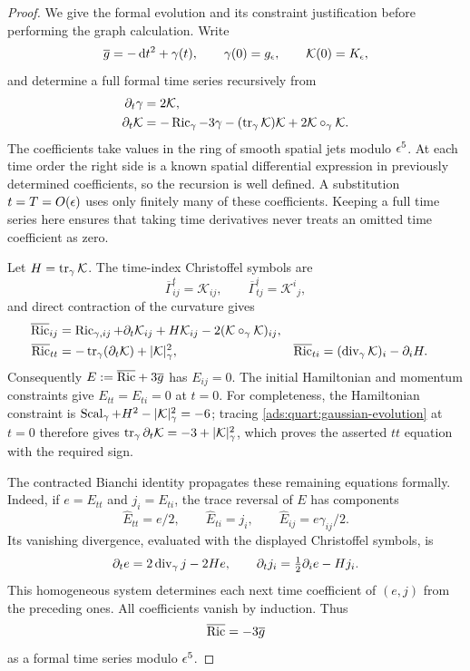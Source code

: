 \begin{proof}
We give the formal evolution and its constraint justification before
performing the graph calculation.  Write
\[
 \overline g=-\,\mathrm d t^2+\gamma(t),\qquad
 \gamma(0)=g_\epsilon,\qquad \mathcal K(0)=K_\epsilon,
\]
and determine a full formal time series recursively from
\begin{align}
 \partial_t\gamma&=2\mathcal K,\nonumber\\
 \partial_t\mathcal K
   &=-\operatorname{Ric}_\gamma-3\gamma
     -(\operatorname{tr}_\gamma\mathcal K)\mathcal K
     +2\mathcal K\circ_\gamma\mathcal K.
 \label{ads:quart:gaussian-evolution}
\end{align}
The coefficients take values in the ring of smooth spatial jets modulo
\(\epsilon^5\).  At each time order the right side is a known spatial
differential expression in previously determined coefficients, so the
recursion is well defined.  A substitution \(t=T=O(\epsilon)\) uses only
finitely many of these coefficients.  Keeping a full time series here
ensures that taking time derivatives never treats an omitted time
coefficient as zero.

Let \(H=\operatorname{tr}_\gamma\mathcal K\).  The time-index Christoffel symbols
are
\[
 \overline\Gamma^t_{ij}=\mathcal K_{ij},\qquad
 \overline\Gamma^i_{tj}=\mathcal K^i{}_j,
\]
and direct contraction of the curvature gives
\begin{align}
 \overline{\operatorname{Ric}}_{ij}
  &=\operatorname{Ric}_{\gamma,ij}+\partial_t\mathcal K_{ij}
       +H\mathcal K_{ij}
       -2(\mathcal K\circ_\gamma\mathcal K)_{ij},\nonumber\\
 \overline{\operatorname{Ric}}_{tt}
  &=-\operatorname{tr}_\gamma(\partial_t\mathcal K)+|\mathcal K|_\gamma^2,
 &\overline{\operatorname{Ric}}_{ti}
  &=(\operatorname{div}_\gamma\mathcal K)_i-\partial_iH.
 \label{ads:quart:gaussian-ricci}
\end{align}
Consequently \(E:=\overline{\operatorname{Ric}}+3\overline g\) has \(E_{ij}=0\).
The initial Hamiltonian and momentum constraints give
\(E_{tt}=E_{ti}=0\) at \(t=0\).  For completeness, the Hamiltonian
constraint is
\(\operatorname{Scal}_\gamma+H^2-|\mathcal K|_\gamma^2=-6\); tracing
\eqref{ads:quart:gaussian-evolution} at \(t=0\) therefore gives
\(\operatorname{tr}_\gamma\partial_t\mathcal K=-3+|\mathcal K|_\gamma^2\),
which proves the asserted \(tt\) equation with the required sign.

The contracted Bianchi identity propagates these remaining equations
formally.  Indeed, if \(e=E_{tt}\) and \(j_i=E_{ti}\), the trace
reversal of \(E\) has components
\[
 \widehat E_{tt}=e/2,\qquad
 \widehat E_{ti}=j_i,\qquad
 \widehat E_{ij}=e\gamma_{ij}/2.
\]
Its vanishing divergence, evaluated with the displayed Christoffel
symbols, is
\begin{equation}
 \partial_t e=2\operatorname{div}_\gamma j-2He,
 \qquad
 \partial_tj_i=\tfrac12\partial_i e-Hj_i.
 \label{ads:quart:bianchi-system}
\end{equation}
This homogeneous system determines each next time coefficient of
\((e,j)\) from the preceding ones.  All coefficients vanish by
induction.  Thus
\begin{equation}
 \overline{\operatorname{Ric}}=-3\overline g
 \label{ads:quart:formal-einstein}
\end{equation}
as a formal time series modulo \(\epsilon^5\).


\end{proof}
